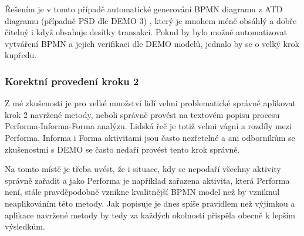 Řešením je v tomto případě automatické generování BPMN diagramu z ATD diagramu (případně PSD dle DEMO 3) , který je mnohem méně obsáhlý a dobře čitelný i když obsahuje desítky transakcí. Pokud by bylo možné automatizovat vytváření BPMN a jejich verifikaci dle DEMO modelů, jednalo by se o velký krok kupředu.

\subsubsection{Korektní provedení kroku 2}
Z mé zkušenosti je pro velké množství lidí velmi problematické správně aplikovat krok 2 navržené metody, neboli správně provést na textovém popisu procesu Performa-Informa-Forma analýzu. Lidská řeč je totiž velmi vágní a rozdíly mezi Performa, Informa i Forma aktivitami jsou často nezřetelné a ani odborníkům se zkušenostmi s DEMO se často nedaří provést tento krok správně.

Na tomto místě je třeba uvést, že i situace, kdy se nepodaří všechny aktivity správně zařadit a jako Performa je například zařazena aktivita, která Performa není, stále pravděpodobně vznikne kvalitnější BPMN model než by vzniknul neaplikováním této metody. Jak popisuje \cite{Silver2011}  je dnes spíše pravidlem než výjimkou a aplikace navržené metody by tedy za každých okolností přispěla obecně k lepším výsledkům.